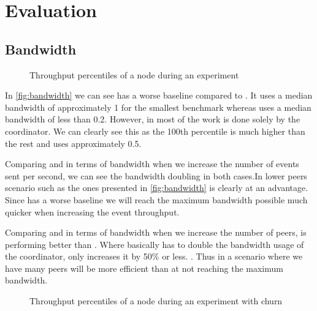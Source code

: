
\section{Evaluation}
\subsection{Bandwidth}
\begin{figure}[h]
	\centering
	
	\vspace{-2mm} 
	\caption{Throughput percentiles of a node during an experiment}
	\vspace{-2mm} 
	\label{fig:bandwidth}
\end{figure}
In \autoref{fig:bandwidth} we can see \epto has a worse baseline compared to \jgroups. It uses a median bandwidth of approximately \SI{1}{\mbps} for the smallest benchmark whereas \jgroups uses a median bandwidth of less than \SI{0.2}{\mbps}. However, in \jgroups most of the work is done solely by the coordinator. We can clearly see this as the 100th percentile is much higher than the rest and uses approximately \SI{.5}{\mbps}.

Comparing \epto and \jgroups in terms of bandwidth when we increase the number of events sent per second, we can see the bandwidth doubling in both cases.In lower peers scenario such as the ones presented in \autoref{fig:bandwidth} \jgroups is clearly at an advantage. Since \epto has a worse baseline we will reach the maximum bandwidth possible much quicker when increasing the event throughput.

Comparing \epto and \jgroups in terms of bandwidth when we increase the number of peers, \epto is performing better than \jgroups. Where \jgroups basically has to double the bandwidth usage of the coordinator, \epto only increases it by 50\% or less. . Thus in a scenario where we have many peers \epto will be more efficient than \jgroups at not reaching the maximum bandwidth.

\begin{figure}
	\centering
	
	\vspace{-2mm} 
	\caption{Throughput percentiles of a node during an experiment with churn}
	\vspace{-2mm} 
	\label{fig:bandwidth-churn}
\end{figure}

